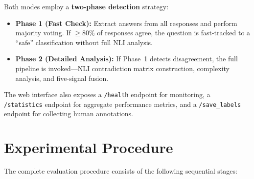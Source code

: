Both modes employ a \textbf{two-phase detection} strategy:

\begin{itemize}
    \item \textbf{Phase 1 (Fast Check):} Extract answers from all responses and perform majority voting. If $\geq 80\%$ of responses agree, the question is fast-tracked to a ``safe'' classification without full NLI analysis.
    \item \textbf{Phase 2 (Detailed Analysis):} If Phase~1 detects disagreement, the full pipeline is invoked---NLI contradiction matrix construction, complexity analysis, and five-signal fusion.
\end{itemize}

The web interface also exposes a \texttt{/health} endpoint for monitoring, a \texttt{/statistics} endpoint for aggregate performance metrics, and a \texttt{/save\_labels} endpoint for collecting human annotations.

\section{Experimental Procedure}
\label{sec:procedure}

The complete evaluation procedure consists of the following sequential stages:

